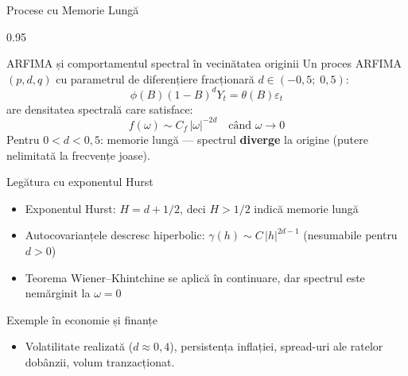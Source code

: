\documentclass[9pt, aspectratio=169, t]{beamer}
\begin{document}
\begin{frame}{Procese cu Memorie Lungă}
    \begin{cminipage}{0.95\textwidth}
    \vspace{-3mm}
    \begin{block}{ARFIMA și comportamentul spectral în vecinătatea originii}
        {\small Un proces ARFIMA$(p,d,q)$ cu parametrul de diferențiere fracționară $d \in (-0{,}5;\; 0{,}5)$:
        \[
            \phi(B)(1-B)^d Y_t = \theta(B)\varepsilon_t
        \]
        are densitatea spectrală care satisface:
        \[
            f(\omega) \sim C_f \, |\omega|^{-2d} \quad \text{când } \omega \to 0
        \]
        Pentru $0 < d < 0{,}5$: memorie lungă --- spectrul \textbf{diverge} la origine (putere nelimitată la frecvențe joase).}
    \end{block}
    \vspace{-2mm}
    \begin{exampleblock}{Legătura cu exponentul Hurst}
        \begin{itemize}\setlength{\itemsep}{-2pt}
            \item Exponentul Hurst: $H = d + 1/2$, deci $H > 1/2$ indică memorie lungă
            \item Autocovarianțele descresc hiperbolic: $\gamma(h) \sim C \, |h|^{2d-1}$ (nesumabile pentru $d > 0$)
            \item Teorema Wiener--Khintchine se aplică în continuare, dar spectrul este nemărginit la $\omega = 0$
        \end{itemize}
    \end{exampleblock}
    \vspace{-2mm}
    \begin{alertblock}{Exemple în economie și finanțe}
        \begin{itemize}\setlength{\itemsep}{0pt}
            \item {\small Volatilitate realizată ($d \approx 0{,}4$), persistența inflației, spread-uri ale ratelor dobânzii, volum tranzacționat.}
        \end{itemize}
    \end{alertblock}
    \end{cminipage}
\end{frame}
\end{document}
